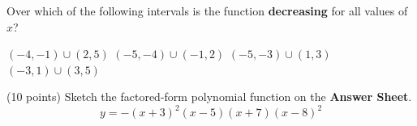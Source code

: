 \documentclass[12pt]{exam}
\begin{document}
\begin{questions}
\vfill

\question Over which of the following intervals is the function {\bf decreasing} for all values of $x$?

\begin{choices} 
	\choice $(-4,-1) \cup (2,5)$
	\choice $(-5,-4) \cup (-1,2)$
	\choice $(-5,-3) \cup (1,3)$
	\correctchoice $(-3,1) \cup (3,5)$
\end{choices}

\vfill


\newpage

\question (10 points) Sketch the factored-form polynomial function on the {\bf Answer Sheet}. %
$$y=-(x+3)^2(x-5)(x+7)(x-8)^2$$

% 

\vfill

% 


\end{questions}
\end{document}
